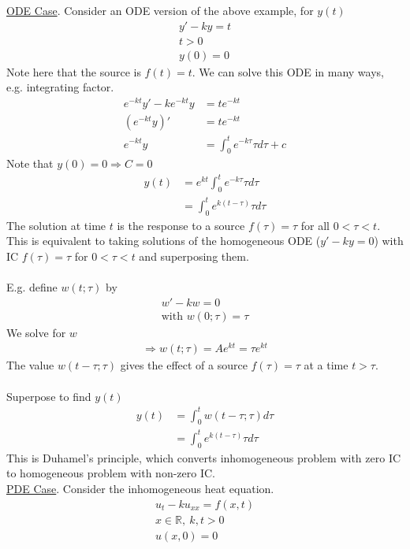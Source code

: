 \documentclass[12pt, letterpaper]{article}
\begin{document}
\underline{ODE Case}. Consider an ODE version of the above example, for $y(t)$ 
\begin{align*}
    y' - ky = t \\
    t > 0 \\
    y(0) = 0
\end{align*}
Note here that the source is $f(t) = t$. We can solve this ODE in many ways, e.g. integrating
factor.
\begin{align*}
    e^{-kt}y' - ke^{-kt}y &= te^{-kt} \\
    (e^{-kt}y)' &= te^{-kt} \\
    e^{-kt}y &= \int_{0}^{t}e^{-k\tau}\tau d\tau + c
\end{align*}
Note that $y(0) = 0 \Rightarrow C = 0$
\begin{align*}
    y(t) &= e^{kt} \int_{0}^{t}e^{-k\tau}\tau d\tau \\
    &= \int_{0}^{t} e^{k(t-\tau)}\tau d\tau
\end{align*}
The solution at time $t$ is the response to a source $f(\tau) = \tau$ for all $0 < \tau < t$.
This is equivalent to taking solutions of the homogeneous ODE ($y'-ky=0$) with IC $f(\tau) = \tau$
for $0 < \tau < t$ and superposing them. \\ \\
E.g. define $w(t;\tau)$ by 
\begin{align*}
    w' - kw = 0 \\
    \text{with } w(0;\tau) = \tau
\end{align*}
We solve for $w$
\begin{align*}
    \Rightarrow w(t;\tau) = Ae^{kt} = \tau e^{kt}
\end{align*}
The value $w(t-\tau;\tau)$ gives the effect of a source $f(\tau) = \tau$ at a time $t > \tau$. \\ \\
Superpose to find $y(t)$
\begin{align*}
    y(t) &= \int_{0}^{t} w(t -\tau;\tau) d\tau \\
    &= \int_{0}^{t}e^{k(t-\tau)}\tau d\tau
\end{align*}
This is Duhamel's principle, which converts inhomogeneous problem with zero IC to homogeneous
problem with non-zero IC. \\
\underline{PDE Case}. Consider the inhomogeneous heat equation.
\begin{align*}
    u_t - ku_{xx} = f(x,t) \\
    x \in \mathbb{R},\ k,t > 0 \\
    u(x,0) = 0
\end{align*}
\end{document}
